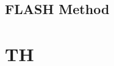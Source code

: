 \documentclass[12pt]{article}
\begin{document}

\subsection{FLASH Method}


\section{TH}
\end{document}
